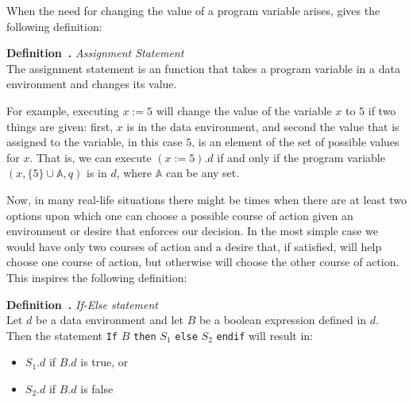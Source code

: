 \documentclass[11pt]{article}
\newcounter{definition}
\newenvironment{definition}[1][]{\stepcounter{definition}\par\medskip\noindent
\textbf{Definition~\thesection.\thedefinition #1} \rmfamily}{}
\newcounter{example}
\newcounter{case}
\newcounter{result}
\begin{document}
When the need for changing the value of a program variable arises, \cite{baber} gives the following definition:

\begin{definition} \emph{Assignment Statement} \\
The assignment statement is an function that takes a program variable in a data environment and changes its value. \medskip
\end{definition}

For example, executing $x:=5$ will change the value of the variable $x$ to $5$ if two things are given: first, $x$ is in the data environment, and second the value that is assigned to the variable, in this case $5$, is an element of the set of possible values for $x$. That is, we can execute $(x:=5).d$ if and only if the program variable $(x,\{5\}\cup\mathbb{A},q)$ is in $d$, where $\mathbb{A}$ can be any set. %

Now, in many real-life situations there might be times when there are at least two options upon which one can choose a possible course of action given an environment or desire that enforces our decision. In the most simple case we would have only two courses of action and a desire that, if satisfied, will help choose one course of action, but otherwise will choose the other course of action. This inspires the following definition:

\begin{definition} \emph{If-Else statement} \\
Let $d$ be a data environment and let $B$ be a boolean expression defined in $d$. Then the statement \texttt{If} $B$ \texttt{then} $S_1$ \texttt{else} $S_2$ \texttt{endif}
will result in:
\begin{itemize}[noitemsep]
 \item $S_1.d$ if $B.d$ is true, or
 \item $S_2.d$ if $B.d$ is false
\end{itemize}
\end{definition}
\end{document}

